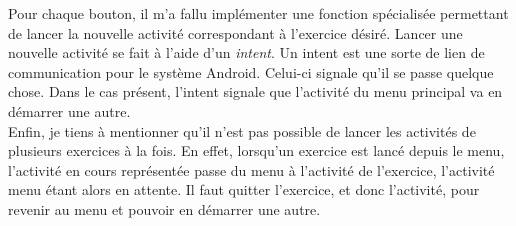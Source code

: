 Pour chaque bouton, il m'a fallu implémenter une fonction spécialisée permettant de lancer la nouvelle activité correspondant à l'exercice désiré.
Lancer une nouvelle activité se fait à l'aide d'un \textit{intent}. Un intent est une sorte de lien de communication pour le système Android. Celui-ci signale qu'il se passe quelque chose. Dans le cas présent, l'intent signale que l'activité du menu principal va en démarrer une autre.\\

Enfin, je tiens à mentionner qu'il n'est pas possible de lancer les activités de plusieurs exercices à la fois. En effet, lorsqu'un exercice est lancé depuis le menu, l'activité en cours représentée passe du menu à l'activité de l'exercice, l'activité menu étant alors en attente. Il faut quitter l'exercice, et donc l'activité, pour revenir au menu et pouvoir en démarrer une autre.






